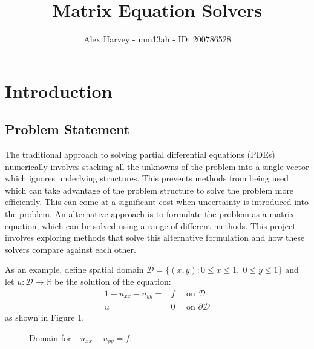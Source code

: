 \documentclass{article}
\title{Matrix Equation Solvers}
\author{Alex Harvey - mm13ah - ID: 200786528}
\date{}
\numberwithin{equation}{section}
\begin{document}
\maketitle

\newpage

\tableofcontents

\clearpage

\section{Introduction}
\subsection{Problem Statement}

The traditional approach to solving partial differential equations (PDEs) numerically involves stacking all the unknowns of the problem into a single vector which ignores underlying structures. This prevents methods from being used which can take advantage of the problem structure to solve the problem more efficiently. This can come at a significant cost when uncertainty is introduced into the problem. An alternative approach is to formulate the problem as a matrix equation, which can be solved using a range of different methods. This project involves exploring methods that solve this alternative formulation and how these solvers compare against each other. 

As an example, define spatial domain $\mathcal{D} = \{(x,y) : 0 \leq x \leq 1, \; 0 \leq y \leq 1 \}$ and let $u: \mathcal{D} \to \mathbb{R}$ be the solution of the equation:
	\begin{alignat}{1} 
	-u_{xx} - u_{yy} = {} & f \quad \text{ on } \mathcal{D} \nonumber \\
	u = {} & 0 \quad \text{ on } \partial \mathcal{D}
	\end{alignat}
as shown in Figure 1.

\begin{figure}[H]
\centering
\caption{Domain for $-u_{xx}-u_{yy}=f$.}
\end{figure}
\end{document}
